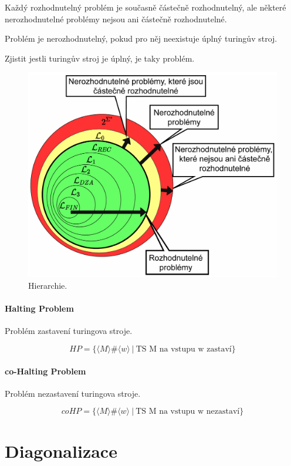 Každý rozhodnutelný problém je současně částečně rozhodnutelný, ale některé nerozhodnutelné problémy nejsou ani částečně rozhodnutelné.

Problém je nerozhodnutelný, pokud pro něj neexistuje úplný turingův stroj.

Zjistit jestli turingův stroj je úplný, je taky problém.

\begin{figure}[H]
    \centering
    \includegraphics[width=0.9\linewidth]{fj_hierarchy.pdf}
    \caption{Hierarchie.}
\end{figure}

\paragraph*{Halting Problem} Problém zastavení turingova stroje.

$$ HP = \{ \langle M \rangle \# \langle w \rangle ~|~ \text{TS M na vstupu w zastaví} \} $$

\paragraph*{co-Halting Problem} Problém nezastavení turingova stroje.

$$ coHP = \{ \langle M \rangle \# \langle w \rangle ~|~ \text{TS M na vstupu w nezastaví} \} $$


\section{Diagonalizace}

